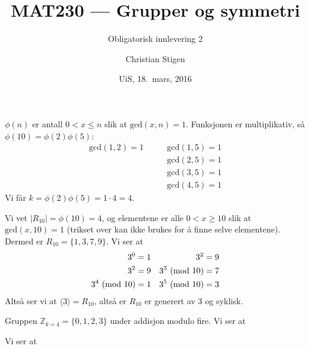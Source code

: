 \documentclass[a4paper,norsk,12pt]{article}
\title{MAT230 --- Grupper og symmetri}
\subtitle{Obligatorisk innlevering 2}
\author{Christian Stigen}
\date{UiS, 18.~mars, 2016}
\begin{document}
\maketitle


$\phi{(n)}$ er antall $0 < x \leqslant n$ slik at $\text{gcd}{(x,n)} = 1$.
Funksjonen er multiplikativ, så $\phi{(10)} = \phi{(2)}\phi{(5)}$:
\begin{align*}
  \text{gcd}(1, 2) = 1 & \qquad\text{gcd}(1, 5) = 1 \\
                       & \qquad\text{gcd}(2, 5) = 1 \\
                       & \qquad\text{gcd}(3, 5) = 1 \\
                       & \qquad\text{gcd}(4, 5) = 1
\end{align*}
Vi får $k = \phi{(2)}\phi{(5)} = 1\cdot4 =4 $.

Vi vet $|R_10| = \phi{(10)} = 4$, og elementene er alle $0<x\geqslant 10$ slik
at $\text{gcd}(x,10)=1$ (trikset over kan ikke brukes for å finne selve
elementene). Dermed er $R_{10} = \{ 1,3,7,9 \}$. Vi ser at
\begin{align*}
  3^0 &= 1         & 3^2 &= 9 \\
  3^2 &= 9         & 3^3 \ (\text{mod}\ 10) &= 7 \\
  3^4\ (\text{mod}\ 10) &= 1 & 3^5\ (\text{mod}\ 10) &= 3
\end{align*}
Altså ser vi at $\langle 3 \rangle = R_{10}$, altså er $R_{10}$ er generert av
3 og syklisk.

Gruppen $\mathbb{Z}_{k=4} = \{0,1,2,3\}$ under addisjon modulo fire. Vi ser at

Vi ser at 
\end{document}
